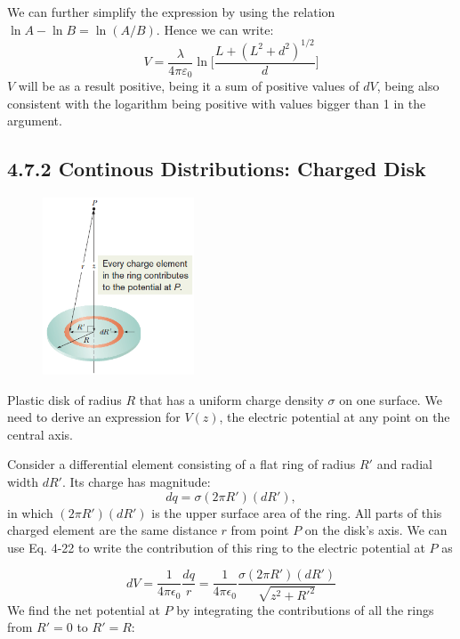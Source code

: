 \documentclass[12pt, a4paper]{article}
\begin{document}
		We can further simplify the expression by using the relation $\ln A - \ln B = \ln ( A / B )$. Hence we can write: 
		\begin{equation*}
			V = \frac{\lambda}{4 \pi \varepsilon_0} 
			     \ln \biggl[ \frac{L + ( L^2 + d^2 )^{1/2}}{d} \biggl]
			\tag{Potential due to Line of Charge, 4-26}
		\end{equation*}
		$V$ will be as a result positive, being it a sum of positive values of $dV$, being also consistent with the logarithm being positive with values bigger than 1 in the argument. 
		
		
		
		\subsection*{4.7.2 Continous Distributions: Charged Disk}

		\begin{figure}
			\centering
			\includegraphics[width=4.5cm]{Physics2_PNGs/disk-continous.png}
			\caption*{}
			\label{fig:disk-continous.png}
		\end{figure}
		Plastic disk of radius $R$ that has a uniform charge density $\sigma$ on one surface. We need to derive an expression for $V(z)$, the electric potential at any point on the central axis.
		
		Consider a differential element consisting of a flat ring of radius \( R' \) and radial width \( dR' \). Its charge has magnitude:
		\[
		dq = \sigma (2\pi R') (dR'),
		\]
		in which $(2\pi R')(dR')$ is the upper surface area of the ring. All parts of this charged element are the same distance $r$ from point $P$ on the disk’s axis. We can use Eq. 4-22 to write the contribution of this ring to the electric potential at \( P \) as
		
		\[
			dV = \frac{1}{4\pi \epsilon_0} \frac{dq}{r} = \frac{1}{4\pi \epsilon_0} 		 \frac{\sigma (2\pi R')(dR')}{\sqrt{z^2 + R'^2}}
			\tag{4-27}
		\]
		We find the net potential at $P$ by integrating the contributions of all the rings from $R' = 0$ to $R' = R$:
		
\end{document}
